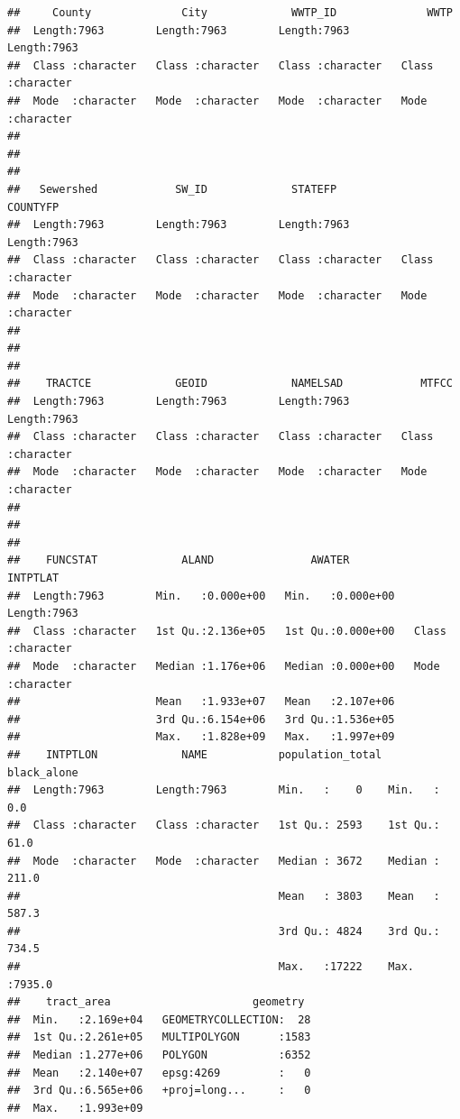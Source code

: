 \documentclass[
]{book}
\begin{document}
\begin{verbatim}
##     County              City             WWTP_ID              WWTP          
##  Length:7963        Length:7963        Length:7963        Length:7963       
##  Class :character   Class :character   Class :character   Class :character  
##  Mode  :character   Mode  :character   Mode  :character   Mode  :character  
##                                                                             
##                                                                             
##                                                                             
##   Sewershed            SW_ID             STATEFP            COUNTYFP        
##  Length:7963        Length:7963        Length:7963        Length:7963       
##  Class :character   Class :character   Class :character   Class :character  
##  Mode  :character   Mode  :character   Mode  :character   Mode  :character  
##                                                                             
##                                                                             
##                                                                             
##    TRACTCE             GEOID             NAMELSAD            MTFCC          
##  Length:7963        Length:7963        Length:7963        Length:7963       
##  Class :character   Class :character   Class :character   Class :character  
##  Mode  :character   Mode  :character   Mode  :character   Mode  :character  
##                                                                             
##                                                                             
##                                                                             
##    FUNCSTAT             ALAND               AWATER            INTPTLAT        
##  Length:7963        Min.   :0.000e+00   Min.   :0.000e+00   Length:7963       
##  Class :character   1st Qu.:2.136e+05   1st Qu.:0.000e+00   Class :character  
##  Mode  :character   Median :1.176e+06   Median :0.000e+00   Mode  :character  
##                     Mean   :1.933e+07   Mean   :2.107e+06                     
##                     3rd Qu.:6.154e+06   3rd Qu.:1.536e+05                     
##                     Max.   :1.828e+09   Max.   :1.997e+09                     
##    INTPTLON             NAME           population_total  black_alone    
##  Length:7963        Length:7963        Min.   :    0    Min.   :   0.0  
##  Class :character   Class :character   1st Qu.: 2593    1st Qu.:  61.0  
##  Mode  :character   Mode  :character   Median : 3672    Median : 211.0  
##                                        Mean   : 3803    Mean   : 587.3  
##                                        3rd Qu.: 4824    3rd Qu.: 734.5  
##                                        Max.   :17222    Max.   :7935.0  
##    tract_area                      geometry   
##  Min.   :2.169e+04   GEOMETRYCOLLECTION:  28  
##  1st Qu.:2.261e+05   MULTIPOLYGON      :1583  
##  Median :1.277e+06   POLYGON           :6352  
##  Mean   :2.140e+07   epsg:4269         :   0  
##  3rd Qu.:6.565e+06   +proj=long...     :   0  
##  Max.   :1.993e+09
\end{verbatim}
\end{document}
